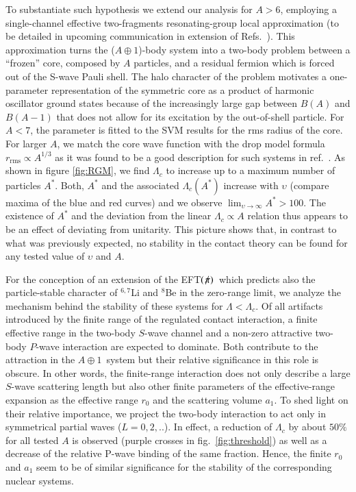 \documentclass[preprint,12pt]{elsarticle}
\newcommand{\lc}{\ensuremath{\Lambda_c}}
\newcommand{\abb}{\mbox{\ensuremath{A\oplus 1}}}
\newcommand{\eftnopi}{\mbox{EFT$(\not \! \pi)$}}
\newcommand{\figref}[1]{fig.~\ref{#1}}
\begin{document}
%
To substantiate such hypothesis we extend our analysis for $A>6$, employing a single-channel effective two-fragments resonating-group local approximation (to be detailed in upcoming communication in extension of Refs.~\cite{PhysRev.52.1083,Naidon_2016}). 
This approximation turns the (\abb)-body system into a two-body problem between a ``frozen'' core, composed by $A$ particles, and a residual fermion which is forced out of the S-wave Pauli shell.
The halo character of the problem motivates a one-parameter representation of the symmetric core as a product of harmonic oscillator ground states because of the increasingly large gap between $B(A)$ and $B(A-1)$ that does not allow for its excitation by the out-of-shell particle.
For $A<7$, the parameter is fitted to the SVM results for the rms radius of the core.
For larger $A$, we match the core wave function with the drop model formula $r_\text{rms}\propto A^{1/3}$ as 
it was found to be a good description for such systems in ref.~\cite{manybosons}.
%    
As shown in figure \ref{fig:RGM}, we find $\lc$ to increase up to a maximum number of particles $A^*$.
Both, $A^*$ and the associated $\lc(A^*)$ increase with $\upsilon$
(compare maxima of the blue and red curves) and
we observe $\lim_{\upsilon\to\infty}A^*>100$.
The existence of $A^*$ and the deviation from the linear $\Lambda_c\propto A$ relation thus appears to be an effect of deviating from unitarity.
This picture shows that, in contrast to what was previously expected, no stability in the contact theory can be found for any tested value of $\upsilon$ and $A$.
%

%
For the conception of an extension of the \eftnopi~which predicts also the particle-stable character of $^{6,7}$Li and $^8$Be in the zero-range limit, we analyze the mechanism behind the stability of these systems for $\Lambda<\lc$.
Of all artifacts introduced by the finite range of the regulated contact interaction, a finite effective range in the two-body $S$-wave channel and a non-zero attractive two-body $P$-wave interaction are expected to dominate. 
Both contribute to the attraction in the \abb~system but their relative significance in this role is obscure.
In other words, the finite-range interaction does not only describe a large $S$-wave scattering length but also other finite parameters of the effective-range expansion as the effective range $r_0$ and the scattering volume $a_1$.
To shed light on their relative importance, we project the two-body interaction to act only in symmetrical partial waves ($L=0,2,..$).
In effect, a reduction of $\lc$ by about $50\%$ for all tested $A$ is observed (purple crosses in \figref{fig:threshold}) as well as a decrease of the relative P-wave binding of the same fraction.
Hence, the finite $r_0$ and $a_1$ seem to be of similar significance for the stability of the corresponding nuclear systems.
%
\end{document}
